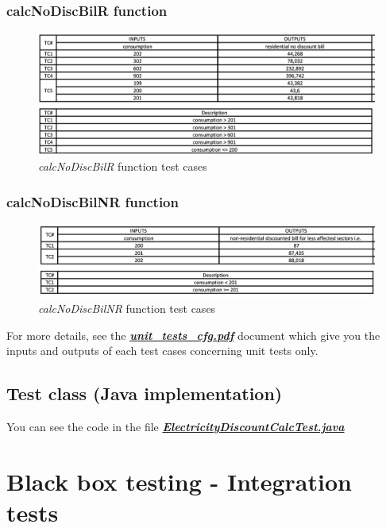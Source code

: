 \documentclass{article}
\begin{document}
    \subsubsection{calcNoDiscBilR function}

    \begin{figure}[h!]
        \includegraphics[width=0.8\linewidth, center]{unit_tests/calcNoDiscBilR.png}
        \caption{\textit{calcNoDiscBilR} function test cases}
        \label{fig:calcNoDiscBilR}
    \end{figure}


    \subsubsection{calcNoDiscBilNR function}

    \begin{figure}[h!]
        \includegraphics[width=0.8\linewidth, center]{unit_tests/calcNoDiscBilNR.png}
        \caption{\textit{calcNoDiscBilNR} function test cases}
        \label{fig:calcNoDiscBilNR}
    \end{figure}
    
    For more details, see the \underline{\textbf{\textit{unit\_tests\_cfg.pdf}}}
    document which give you the inputs and outputs of each test cases concerning unit tests only.

    \subsection{Test class (Java implementation)}

    You can see the code in the file \underline{\textbf{\textit{ElectricityDiscountCalcTest.java}}}

    \newpage

    \section{Black box testing - Integration tests}
\end{document}
